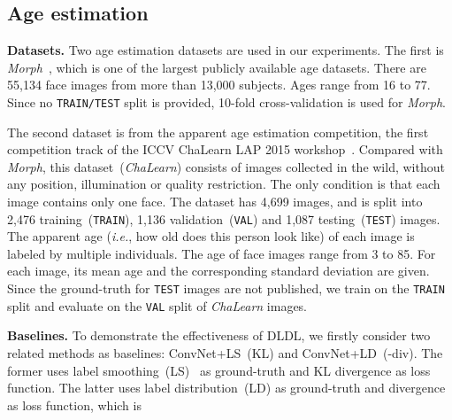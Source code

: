 \documentclass[journal]{IEEEtran}
\begin{document}
\subsection{Age estimation} \label{subsec:ex-age}
\textbf{Datasets.} Two age estimation datasets are used in our experiments. The first is \emph{Morph}~\cite{ricanek2006morph}, which is one of the largest publicly available age datasets. There are 55,134 face images from more than 13,000 subjects. Ages range from 16 to 77. Since no \texttt{TRAIN/TEST} split is provided, 10-fold cross-validation is used for \emph{Morph}.

The second dataset is from the apparent age estimation competition, the first competition track of the ICCV ChaLearn LAP 2015 workshop~\cite{escalera2015chalearn}. Compared with \emph{Morph}, this dataset~(\emph{ChaLearn}) consists of images collected in the wild, without any position, illumination or quality restriction. The only condition is that each image contains only one face. The dataset has 4,699 images, and is split into 2,476 training~(\texttt{TRAIN}), 1,136 validation~(\texttt{VAL}) and 1,087 testing~(\texttt{TEST}) images. The apparent age (\emph{i.e.}, how old does this person look like) of each image is labeled by multiple individuals. The age of face images range from 3 to 85. For each image, its mean age and the corresponding standard deviation are given. Since the ground-truth for \texttt{TEST} images are not published, we train on the \texttt{TRAIN} split and evaluate on the \texttt{VAL} split of \emph{ChaLearn} images.

\textbf{Baselines.}
To demonstrate the effectiveness of DLDL, we firstly consider two related methods as baselines: ConvNet+LS~(KL) and ConvNet+LD~(-div). The former uses label smoothing~(LS)~\cite{szegedy2015rethinking} as ground-truth and KL divergence as loss function. The latter uses label distribution~(LD) as ground-truth and  divergence~\cite{minka2005divergence} as loss function, which is
\end{document}
